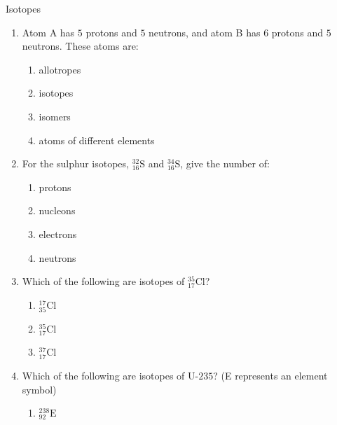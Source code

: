    \begin{exercises}  {Isotopes }
            \nopagebreak \noindent \vspace{-2cm}
        \label{m38753*id258162}\begin{enumerate}[noitemsep, label=\textbf{\arabic*}. ] 
            \label{m38753*uid50}\item Atom A has $5$ protons and $5$ neutrons, and atom B has $6$ protons and $5$ neutrons. These atoms are:
\label{m38753*id258178}\begin{enumerate}[noitemsep, label=\textbf{\alph*}. ] 
            \label{m38753*uid51}\item allotropes
\label{m38753*uid52}\item isotopes
\label{m38753*uid53}\item isomers
\label{m38753*uid54}\item atoms of different elements
\end{enumerate}
                \label{m38753*uid55}\item For the sulphur isotopes, $_{16}^{32}\text{S}$ and $_{16}^{34}\text{S}$, give the number of:
\label{m38753*id258277}\begin{enumerate}[noitemsep, label=\textbf{\alph*}. ] 
            \label{m38753*uid56}\item protons
\label{m38753*uid57}\item nucleons
\label{m38753*uid58}\item electrons
\label{m38753*uid59}\item neutrons
\end{enumerate}
                \label{m38753*uid60}\item Which of the following are isotopes of $_{17}^{35}\text{Cl}$?
\label{m38753*id258355}\begin{enumerate}[noitemsep, label=\textbf{\alph*}. ] 
            \label{m38753*uid61}\item $_{35}^{17}\text{Cl}$
\label{m38753*uid62}\item $_{17}^{35}\text{Cl}$
\label{m38753*uid63}\item $_{17}^{37}\text{Cl}$
\end{enumerate}
                \label{m38753*uid64}\item Which of the following are isotopes of $\text{U-}235$? (E represents an element symbol)
\label{m38753*id258452}\begin{enumerate}[noitemsep, label=\textbf{\alph*}. ] 
            \label{m38753*uid65}\item $_{92}^{238}\text{E}$

\end{enumerate}
\end{enumerate}
\end{exercises}
